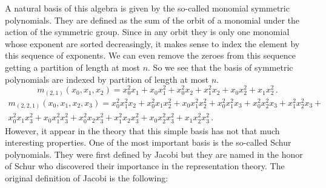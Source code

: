 \documentclass[12pt,a4paper]{article}
\begin{document}
A natural basis of this algebra is given by the so-called monomial symmetric
polynomials. They are defined as the sum of the orbit of a monomial under the
action of the symmetric group. Since in any orbit they is only one monomial
whose exponent are sorted decreasingly, it makes sense to index the element by
this sequence of exponents. We can even remove the zeroes from this sequence
getting a partition of length at most $n$. So we see that the basis of
symmetric polynomials are indexed by partition of length at most $n$.
\begin{equation*}
  m_{(2,1)}(x_0,x_1,x_2) =
  x_0^2x_1 + x_0x_1^2 + x_0^2x_2 + x_1^2x_2 + x_0x_2^2 + x_1x_2^2\,.
\end{equation*}
\begin{multline*}
  m_{(2,2,1)}(x_0,x_1,x_2,x_3) =
  x_0^2x_1^2x_2 + x_0^2x_1x_2^2 + x_0x_1^2x_2^2 + x_0^2x_1^2x_3 +
  x_0^2x_2^2x_3 + x_1^2x_2^2x_3 + \\
  x_0^2x_1x_3^2 + x_0x_1^2x_3^2 + x_0^2x_2x_3^2 + x_1^2x_2x_3^2 +
  x_0x_2^2x_3^2 + x_1x_2^2x_3^2\,.
\end{multline*}
However, it appear in the theory that this simple basis has not that much
interesting properties. One of the most important basis is the so-called Schur
polynomials. They were first defined by Jacobi but they are named in the honor
of Schur who discovered their importance in the representation theory. The
original definition of Jacobi is the following: 
\end{document}
